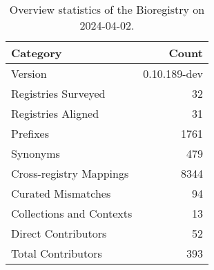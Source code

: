 \begin{table}
\caption{Overview statistics of the Bioregistry on 2024-04-02.}
\label{tab:bioregistry-summary}
\begin{tabular}{lr}
\toprule
Category & Count \\
\midrule
Version & 0.10.189-dev \\
Registries Surveyed & 32 \\
Registries Aligned & 31 \\
Prefixes & 1761 \\
Synonyms & 479 \\
Cross-registry Mappings & 8344 \\
Curated Mismatches & 94 \\
Collections and Contexts & 13 \\
Direct Contributors & 52 \\
Total Contributors & 393 \\
\bottomrule
\end{tabular}
\end{table}
